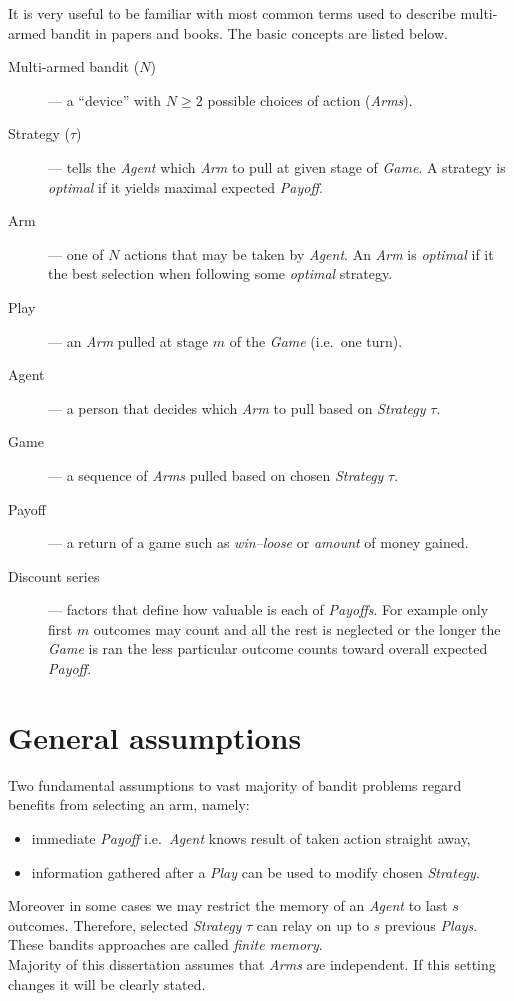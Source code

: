 \documentclass[12pt, a4paper, pdflatex, leqno]{report}
\begin{document}
It is very useful to be familiar with most common terms used to describe multi-armed bandit in papers and books. The basic concepts are listed below.
\begin{description}
\item[Multi-armed bandit ($N$)]--- a ``device'' with $N \geq 2$ possible choices of action (\emph{Arms}).
\item[Strategy ($\tau$)]--- tells the \emph{Agent} which \emph{Arm} to pull at given stage of \emph{Game}. A strategy is \emph{optimal} if it yields maximal expected \emph{Payoff}.
\item[Arm]--- one of $N$ actions that may be taken by \emph{Agent}. An \emph{Arm} is \emph{optimal} if it the best selection when following some \emph{optimal} strategy.
\item[Play]--- an \emph{Arm} pulled at stage $m$ of the \emph{Game} (i.e.\ one turn).
\item[Agent]--- a person that decides which \emph{Arm} to pull based on \emph{Strategy} $\tau$.
\item[Game]--- a sequence of \emph{Arms} pulled based on chosen \emph{Strategy} $\tau$.
\item[Payoff]--- a return of a game such as \emph{win--loose} or \emph{amount} of money gained.
\item[Discount series]--- factors that define how valuable is each of \emph{Payoffs}. For example only first $m$ outcomes may count and all the rest is neglected or the longer the \emph{Game} is ran the less particular outcome counts toward overall expected \emph{Payoff}.
\end{description}


\section{General assumptions}
Two fundamental assumptions to vast majority of bandit problems regard benefits from selecting an arm, namely:
\begin{itemize}
\item immediate \emph{Payoff} i.e.\ \emph{Agent} knows result of taken action straight away,
\item information gathered after a \emph{Play} can be used to modify chosen \emph{Strategy}.
\end{itemize}
Moreover in some cases we may restrict the memory of an \emph{Agent} to last $s$ outcomes. Therefore, selected \emph{Strategy} $\tau$ can relay on up to $s$ previous \emph{Plays}. These bandits approaches are called \emph{finite memory}.\\
Majority of this dissertation assumes that \emph{Arms} are independent. If this setting changes it will be clearly stated.
\end{document}
